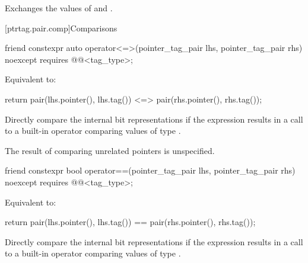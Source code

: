 \begin{itemdescr}
\pnum
\effects
Exchanges the values of  and .
\end{itemdescr}

[ptrtag.pair.comp]{Comparisons}

%
\begin{itemdecl}
friend constexpr auto operator<=>(pointer_tag_pair lhs, pointer_tag_pair rhs)
  noexcept requires @@<tag_type>;
\end{itemdecl}

\begin{itemdescr}
\pnum
\effects
Equivalent to:
\begin{codeblock}
return pair(lhs.pointer(), lhs.tag()) <=> pair(rhs.pointer(), rhs.tag());
\end{codeblock}

\pnum
\recommended
Directly compare the internal bit representations
if the expression 
results in a call to a built-in operator \tcode{<=>}
comparing values of type .

\begin{note}
The result of comparing unrelated pointers is unspecified.
\end{note}
\end{itemdescr}

%
\begin{itemdecl}
friend constexpr bool operator==(pointer_tag_pair lhs, pointer_tag_pair rhs)
  noexcept requires @@<tag_type>;
\end{itemdecl}

\begin{itemdescr}
\pnum
\effects
Equivalent to:
\begin{codeblock}
return pair(lhs.pointer(), lhs.tag()) == pair(rhs.pointer(), rhs.tag());
\end{codeblock}

\pnum
\recommended
Directly compare the internal bit representations
if the expression 
results in a call to a built-in operator \tcode{==}
comparing values of type .
\end{itemdescr}

